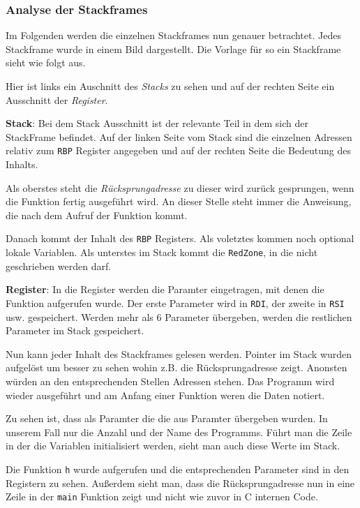 \documentclass[12pt]{article}
\begin{document}
\subsubsection{Analyse der Stackframes}


Im Folgenden werden die einzelnen Stackframes nun genauer betrachtet. Jedes Stackframe wurde in einem Bild dargestellt. Die Vorlage für so ein Stackframe sieht wie folgt aus. 


Hier ist links ein Auschnitt des \textit{Stacks} zu sehen und auf der rechten Seite ein Ausschnitt der \textit{Register}. 

\textbf{Stack}: \newline
Bei dem Stack Ausschnitt ist der relevante Teil in dem sich der StackFrame befindet. Auf der linken Seite vom Stack sind die einzelnen Adressen relativ zum \texttt{RBP} Register angegeben und auf der rechten Seite die Bedeutung des Inhalts. 

Als oberstes steht die \textit{Rücksprungadresse} zu dieser wird zurück gesprungen, wenn die Funktion fertig ausgeführt wird. An dieser Stelle steht immer die Anweisung, die nach dem Aufruf der Funktion kommt. 

Danach kommt der Inhalt des \texttt{RBP} Registers. %
Als voletztes kommen noch optional lokale Variablen.
Als unterstes im Stack kommt die \texttt{RedZone}, in die nicht geschrieben werden darf.

\textbf{Register}: \newline
In die Register werden die Paramter eingetragen, mit denen die Funktion aufgerufen wurde. Der erste Parameter wird in \texttt{RDI}, der zweite in \texttt{RSI} usw. gespeichert. Werden mehr als 6 Parameter übergeben, werden die restlichen Parameter im Stack gespeichert.

Nun kann jeder Inhalt des Stackframes gelesen werden. Pointer im Stack wurden aufgelöst um besser zu sehen wohin z.B. die Rücksprungadresse zeigt. Anonsten würden an den entsprechenden Stellen Adressen stehen. Das Programm wird wieder ausgeführt und am Anfang einer Funktion weren die Daten notiert.

Zu sehen ist, dass als Paramter die die aus Paramter übergeben wurden. In unserem Fall nur die Anzahl und der Name des Programms. Führt man die Zeile in der die Variablen initialisiert werden, sieht man auch diese Werte im Stack.

Die Funktion \texttt{h} wurde aufgerufen und die entsprechenden Parameter sind in den Registern zu sehen. Außerdem sieht man, dass die Rücksprungadresse nun in eine Zeile in der \texttt{main} Funktion zeigt und nicht wie zuvor in C internen Code.
\end{document}
